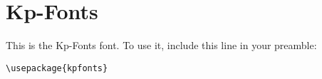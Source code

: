 \documentclass{article}
\begin{document}
\section*{Kp-Fonts}
This is the Kp-Fonts font.
To use it, include this line in your preamble:
\begin{verbatim}
\usepackage{kpfonts}
\end{verbatim}


\end{document}
